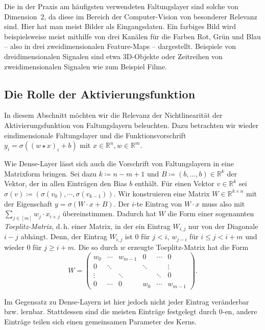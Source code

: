\documentclass[paper=a4, 	%
		fontsize=11pt,
		abstract=true, 	%
		headsepline, 	%
		notitlepage	%
		]{scrartcl}
\theoremstyle{definition}
\newcommand{\R}{\mathbb{R}}
\newcommand{\fNat}[1]{[ #1 ]}
\begin{document}
Die in der Praxis am häufigsten verwendeten Faltungslayer sind solche von Dimension~$2$, da diese im Bereich der Computer-Vision von besonderer Relevanz sind.
Hier hat man meist Bilder als Eingangsdaten.
Ein farbiges Bild wird beispielsweise meist mithilfe von drei Kanälen für die Farben Rot, Grün und Blau -- also in drei zweidimensionalen Feature-Maps -- dargestellt.
Beispiele von dreidimensionalen Signalen sind etwa 3D-Objekte oder Zeitreihen von zweidimensionalen Signalen wie zum Beispiel Filme.

\subsection{Die Rolle der Aktivierungsfunktion}

In diesem Abschnitt möchten wir die Relevanz der Nichtlinearität der Aktivierungsfunktion von Faltungslayern beleuchten.
Dazu betrachten wir wieder eindimensionale Faltungslayer und die Funktionsvorschrift $y_i = \sigma( (w\star x)_i + b )$ mit $x\in\R^n, w\in\R^m$.

Wie Dense-Layer lässt sich auch die Vorschrift von Faltungslayern in eine Matrixform bringen.
Sei dazu $k\coloneqq n-m+1$ und $B\coloneqq (b, \dots, b)\in\R^k$ der Vektor, der in allen Einträgen den Bias $b$ enthält.
Für einen Vektor $v\in\R^k$ sei $\sigma(v) \coloneqq (\sigma(v_0), \cdots, \sigma(v_{k-1}))$.
Wir konstruieren eine Matrix $W\in\R^{k\times n}$ mit der Eigenschaft $y = \sigma( W\cdot x + B )$.
Der $i$-te Eintrag von $W\cdot x$ muss also mit $\sum_{j\in\fNat{m}} w_j \cdot x_{i+j}$
übereinstimmen.
Dadurch hat $W$ die Form einer sogenannten \emph{Toeplitz-Matrix}, d.\,h. einer Matrix, in der ein Eintrag $W_{i,j}$ nur von der Diagonale $i-j$ abhängt.
Denn, der Eintrag $W_{i,j}$ ist $0$ für $j < i$, $w_{j-i}$ für $i \leq j < i+m$ und wieder $0$ für $j \geq i+m$.
Die so durch $w$ erzeugte Toeplitz-Matrix hat die Form
\[
    W = \begin{pmatrix}
            w_0 & \cdots & w_{m-1} & 0 & \cdots & 0 \\
            0 & \ddots & & \ddots  & & \vdots \\
            \vdots  & & \ddots & & \ddots & 0 \\[4pt]
             0 & \cdots & 0 & w_0 & \cdots & w_{m-1}
        \end{pmatrix}.
\]

Im Gegensatz zu Dense-Layern ist hier jedoch nicht jeder Eintrag veränderbar bzw. lernbar.
Stattdessen sind die meisten Einträge festgelegt durch $0$-en, andere Einträge teilen sich einen gemeinsamen Parameter des Kerns.
\end{document}
